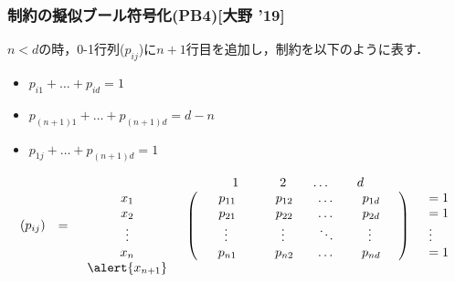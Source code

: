 \begin{frame}
    \frametitle{{\alldiff}制約の擬似ブール符号化(PB4)[大野 '19]}
    \begin{exampleblock}{}
        $n<d$の時，0-1行列($p_{ij}$)に$n+1$行目を追加し，{\alldifferent}制約を以下のように表す．
        \begin{itemize}
            \item $p_{i1} + \dots + p_{id} = 1$
            \item $p_{(n+1)1} + \dots + p_{(n+1)d} = d-n$
            \item $p_{1j} + \dots + p_{(n+1)d} = 1$
        \end{itemize}
        \begin{displaymath}
            \begin{array}{ccccc}
             & & & \begin{array}{cccc}  \;\;\;\;1\;\;\;\;&\;\;\;\;2\;\;\;\;&\dots&\;\;\;\;d\;\;\;\; \end{array}&\\
                (p_{ij})&=&
                \begin{array}{c}x_1\\ x_2\\ \vdots\\ x_n \end{array}&
                \left(
                    \begin{array}{cccc}
                        \;\;\;\;p_{11\;\;\;\;}&\;\;\;\;p_{12\;\;\;\;}&\dots&\;\;\;\;p_{1d\;\;\;\;}\\
                        \;\;\;\;p_{21\;\;\;\;}&\;\;\;\;p_{22\;\;\;\;}&\dots&\;\;\;\;p_{2d\;\;\;\;}\\
                        \;\;\;\;\vdots\;\;\;\;&\;\;\;\;\vdots\;\;\;\;&\ddots&\;\;\;\;\vdots\;\;\;\;\\
                        \;\;\;\;p_{n1\;\;\;\;}&\;\;\;\;p_{n2\;\;\;\;}&\dots&\;\;\;\;p_{nd\;\;\;\;}
                \end{array}\right)&
                \begin{array}{l} = 1\\ = 1\\ \vdots\\ = 1  \end{array}\\
                                                                    & & \begin{array}{c}\alert{x_{n+1}}\\ \\ \\ \end{array}& \begin{array}{cccc}  

\end{array}
\end{array}
\end{displaymath}
\end{exampleblock}
\end{frame}
